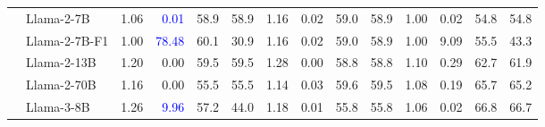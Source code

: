 \begin{table}[t]
{\begin{tabular}{l|l|rrrr|rrrr|rrrr}
                           & Llama-2-7B         & 1.06                    & \textcolor{blue}{0.01}                    & 58.9                    & 58.9                   & 1.16                    & 0.02                    & 59.0                    & 58.9                   & 1.00                    & 0.02                    & 54.8                    & 54.8                  \\
                           & Llama-2-7B-F1             & 1.00                    & \textcolor{blue}{78.48}                   & 60.1                    & 30.9                   & 1.16                    & 0.02                    & 59.0                    & 58.9                   & 1.00                    & 9.09                    & 55.5                    & 43.3                  \\\cmidrule{2-14}
                           & Llama-2-13B        & 1.20                    & 0.00                    & 59.5                    & 59.5                   & 1.28                    & 0.00                    & 58.8                    & 58.8                   & 1.10                    & 0.29                    & 62.7                    & 61.9                  \\
                           & Llama-2-70B        & 1.16                    & 0.00                    & 55.5                    & 55.5                   & 1.14                    & 0.03                    & 59.6                    & 59.5                   & 1.08                    & 0.19                    & 65.7                    & 65.2                  \\ \cmidrule{2-14}
                           & Llama-3-8B         & 1.26                    & \textcolor{blue}{9.96}                    & 57.2                    & 44.0                   & 1.18                    & 0.01                    & 55.8                    & 55.8                   & 1.06                    & 0.02                    & 66.8                    & 66.7                  \\

\end{tabular}}
\end{table}
